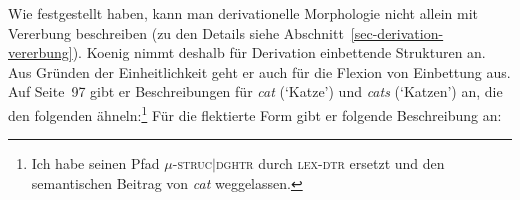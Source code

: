 Wie 
\citet{KN93a} festgestellt haben, kann man derivationelle Morphologie nicht allein mit Vererbung
beschreiben (zu den Details siehe Abschnitt~\ref{sec-derivation-vererbung}). Koenig nimmt deshalb
für Derivation einbettende Strukturen an. Aus Gründen der Einheitlichkeit geht er auch für die
Flexion von Einbettung aus.
Auf Seite~97 gibt er Beschreibungen für \emph{cat} (`Katze') und \emph{cats} (`Katzen') an, die den folgenden ähneln:\footnote{
  Ich habe seinen Pfad \textsc{$\mu$-struc$|$dghtr} durch \textsc{lex-dtr} ersetzt und den semantischen
  Beitrag von \emph{cat} weg\-ge\-lassen.%
}
\eal
\ex 
{}
\ex
{}
\zl
Für die flektierte Form gibt er folgende Beschreibung an:
\ea
{} 
\z
                
